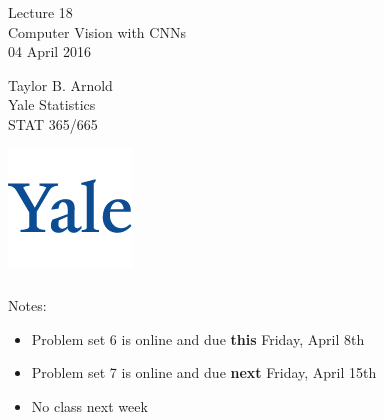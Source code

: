 \documentclass[xetex,mathserif,serif,aspectratio=169]{beamer}
\begin{document}
\begin{frame}[fragile] \frametitle{} \oldB \small

\vfill

{\fontsize{0.7cm}{0cm}\selectfont Lecture 18 \\\vspace{0.2cm}
Computer Vision with CNNs}\\\vspace{0.5cm}
04 April 2016

\vspace{2cm}

\begin{minipage}{0.6\textwidth}
Taylor B. Arnold \\
Yale Statistics \\
STAT 365/665
\end{minipage}
\hfill
\begin{minipage}{0.3\textwidth}\raggedleft
\includegraphics[scale=0.3]{../yale-logo.png}
\end{minipage}%

\end{frame}

\begin{frame}[fragile] \frametitle{} \oldB \small

Notes:
\begin{itemize}
\item Problem set 6 is online and due \textbf{this} Friday, April 8th
\item Problem set 7 is online and due \textbf{next} Friday, April 15th
\item No class next week
\end{itemize}

\end{frame}
\end{document}
